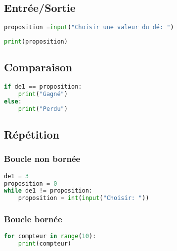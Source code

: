 \documentclass[a4paper,11pt]{article}
\begin{document}
\subsection{Entrée/Sortie}
\begin{center}
\begin{lstlisting}[language=Python  , xleftmargin=2em, xrightmargin=2em]
proposition =input("Choisir une valeur du dé: ")
\end{lstlisting}
\begin{lstlisting}[language=Python  , xleftmargin=2em, xrightmargin=2em]
print(proposition)
\end{lstlisting}
\label{CODE}
\end{center}
\subsection{Comparaison}
\begin{center}
    \begin{lstlisting}[language=Python , basicstyle=\ttfamily, xleftmargin=2em, xrightmargin=2em]
if de1 == proposition:
    print("Gagné")
else:
    print("Perdu")
\end{lstlisting}
\end{center}
\subsection{Répétition}
\subsubsection{Boucle non bornée}
\begin{center}
    \begin{lstlisting}[language=Python , basicstyle=\ttfamily, xleftmargin=2em, xrightmargin=2em]
de1 = 3
proposition = 0
while de1 != proposition:
    proposition = int(input("Choisir: "))
\end{lstlisting}
    \end{center}
\subsubsection{Boucle bornée}
\begin{center}
\begin{lstlisting}[language=Python  , xleftmargin=2em, xrightmargin=2em]
for compteur in range(10):
    print(compteur)
\end{lstlisting}
\label{CODE}
\end{center}
\end{document}

